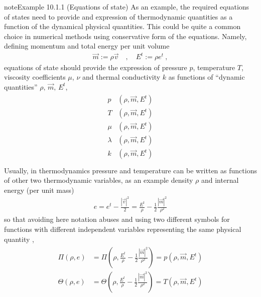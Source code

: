 \documentclass[letterpaper,10pt,english]{jupyterBook}
\begin{document}
\begin{sphinxadmonition}{note}{Example 10.1.1 (Equations of state)}
\sphinxAtStartPar
As an example, the required equations of states need to provide and expression of thermodynamic quantities as a function of the dynamical physical quantities. This could be quite a common choice in numerical methods using conservative form of the equations. Namely, defining momentum and total energy per unit volume
\begin{equation*}
\begin{split}\vec{m} := \rho \vec{v} \quad , \quad E^t := \rho e^t \ ,\end{split}
\end{equation*}
\sphinxAtStartPar
equations of state should provide the expression of pressure \(p\), temperature \(T\), viscosity coefficients \(\mu\), \(\nu\) and thermal conductivity \(k\) as functions of “dynamic quantities” \(\rho, \, \vec{m}, \, E^t\),
\begin{equation*}
\begin{split}\begin{aligned}
        p & (\rho, \vec{m}, E^t) \\
        T & (\rho, \vec{m}, E^t) \\
      \mu & (\rho, \vec{m}, E^t) \\
  \lambda & (\rho, \vec{m}, E^t) \\
        k & (\rho, \vec{m}, E^t) \\
\end{aligned}\end{split}
\end{equation*}
\sphinxAtStartPar
Usually, in thermodynamics pressure and temperature can be written as functions of other two thermodynamic variables, as an example density \(\rho\) and internal energy (per unit mass)
\begin{equation*}
\begin{split}e = e^t - \frac{|\vec{v}|^2}{2} = \frac{E^t}{\rho} - \frac{1}{2}\frac{|\vec{m}|^2}{\rho^2}\end{split}
\end{equation*}
\sphinxAtStartPar
so that \sphinxhyphen{} avoiding here notation abuses and using two different symbols for functions with different independent variables representing the same physical quantity \sphinxhyphen{},
\begin{equation*}
\begin{split}\begin{aligned}
  \Pi   \left( \rho, e \right) & = \Pi   \left( \rho, \frac{E^t}{\rho} - \frac{1}{2}\frac{|\vec{m}|^2}{\rho^2} \right) = p(\rho, \vec{m}, E^t) \\
  \Theta\left( \rho, e \right) & = \Theta\left( \rho, \frac{E^t}{\rho} - \frac{1}{2}\frac{|\vec{m}|^2}{\rho^2} \right) = T(\rho, \vec{m}, E^t) \\
\end{aligned}\end{split}
\end{equation*}\end{sphinxadmonition}
\end{document}
